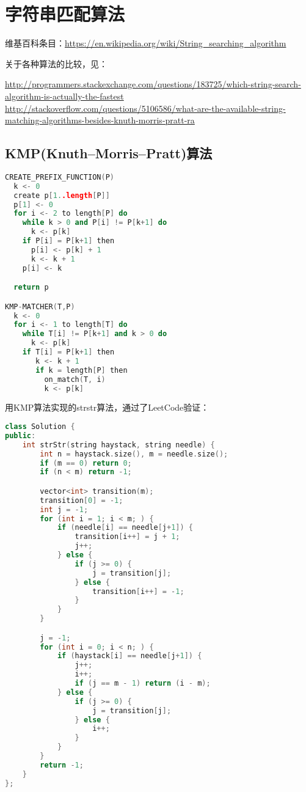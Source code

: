 \section{字符串匹配算法}

维基百科条目：\url{https://en.wikipedia.org/wiki/String_searching_algorithm}

关于各种算法的比较，见：

\url{http://programmers.stackexchange.com/questions/183725/which-string-search-algorithm-is-actually-the-fastest}
\url{http://stackoverflow.com/questions/5106586/what-are-the-available-string-matching-algorithms-besides-knuth-morris-pratt-ra}


\subsection{KMP(Knuth–Morris–Pratt)算法}
\begin{lstlisting}[language=C++]
CREATE_PREFIX_FUNCTION(P)
  k <- 0
  create p[1..length[P]]
  p[1] <- 0
  for i <- 2 to length[P] do
    while k > 0 and P[i] != P[k+1] do
      k <- p[k]
    if P[i] = P[k+1] then
      p[i] <- p[k] + 1
      k <- k + 1
    p[i] <- k

  return p

KMP-MATCHER(T,P)
  k <- 0
  for i <- 1 to length[T] do
    while T[i] != P[k+1] and k > 0 do
      k <- p[k]
    if T[i] = P[k+1] then
       k <- k + 1
       if k = length[P] then
         on_match(T, i)
         k <- p[k]

\end{lstlisting}

用KMP算法实现的strstr算法，通过了LeetCode验证：
\begin{lstlisting}[language=C++]
class Solution {
public:
    int strStr(string haystack, string needle) {
        int n = haystack.size(), m = needle.size();
        if (m == 0) return 0;
        if (n < m) return -1;

        vector<int> transition(m);
        transition[0] = -1;
        int j = -1;
        for (int i = 1; i < m; ) {
            if (needle[i] == needle[j+1]) {
                transition[i++] = j + 1;
                j++;
            } else {
                if (j >= 0) {
                    j = transition[j];
                } else {
                    transition[i++] = -1;
                }
            }
        }

        j = -1;
        for (int i = 0; i < n; ) {
            if (haystack[i] == needle[j+1]) {
                j++;
                i++;
                if (j == m - 1) return (i - m);
            } else {
                if (j >= 0) {
                    j = transition[j];
                } else {
                    i++;
                }
            }
        }
        return -1;
    }
};


\end{lstlisting}

